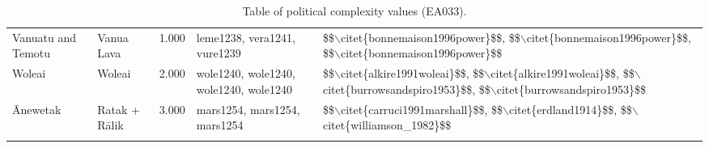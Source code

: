 \begin{longtable}{p{1.8cm}p{1.8cm}p{1.8cm}p{2cm}p{7cm}}
  Vanuatu and Temotu & Vanua Lava & 1.000 & leme1238, vera1241, vure1239 & \$\$$\backslash$citet\{bonnemaison1996power\}\$\$, \$\$$\backslash$citet\{bonnemaison1996power\}\$\$, \$\$$\backslash$citet\{bonnemaison1996power\}\$\$ \\ 
  Woleai & Woleai & 2.000 & wole1240, wole1240, wole1240, wole1240 & \$\$$\backslash$citet\{alkire1991woleai\}\$\$, \$\$$\backslash$citet\{alkire1991woleai\}\$\$, \$\$$\backslash$citet\{burrowsandspiro1953\}\$\$, \$\$$\backslash$citet\{burrowsandspiro1953\}\$\$ \\ 
  Ānewetak & Ratak + Rālik & 3.000 & mars1254, mars1254, mars1254 & \$\$$\backslash$citet\{carruci1991marshall\}\$\$, \$\$$\backslash$citet\{erdland1914\}\$\$, \$\$$\backslash$citet\{williamson\_1982\}\$\$ \\ 
   \bottomrule
\caption{Table of political complexity values (EA033).} 
\label{appendix_pol_complex_xtable}
\end{longtable}
